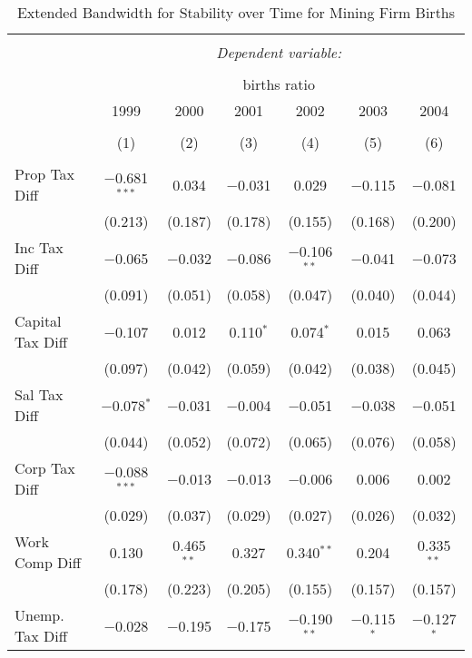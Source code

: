 
\begin{table}[!htbp] \centering 
  \caption{Extended Bandwidth for Stability over Time for  Mining Firm Births} 
  \label{21 ebyear} 
\small 
\begin{tabular}{@{\extracolsep{5pt}}lcccccc} 
\\[-1.8ex]\hline 
\hline \\[-1.8ex] 
 & \multicolumn{6}{c}{\textit{Dependent variable:}} \\ 
\cline{2-7} 
\\[-1.8ex] & \multicolumn{6}{c}{births ratio} \\ 
 & 1999 & 2000 & 2001 & 2002 & 2003 & 2004 \\ 
\\[-1.8ex] & (1) & (2) & (3) & (4) & (5) & (6)\\ 
\hline \\[-1.8ex] 
 Prop Tax Diff & $-$0.681$^{***}$ & 0.034 & $-$0.031 & 0.029 & $-$0.115 & $-$0.081 \\ 
  & (0.213) & (0.187) & (0.178) & (0.155) & (0.168) & (0.200) \\ 
  Inc Tax Diff & $-$0.065 & $-$0.032 & $-$0.086 & $-$0.106$^{**}$ & $-$0.041 & $-$0.073 \\ 
  & (0.091) & (0.051) & (0.058) & (0.047) & (0.040) & (0.044) \\ 
  Capital Tax Diff & $-$0.107 & 0.012 & 0.110$^{*}$ & 0.074$^{*}$ & 0.015 & 0.063 \\ 
  & (0.097) & (0.042) & (0.059) & (0.042) & (0.038) & (0.045) \\ 
  Sal Tax Diff & $-$0.078$^{*}$ & $-$0.031 & $-$0.004 & $-$0.051 & $-$0.038 & $-$0.051 \\ 
  & (0.044) & (0.052) & (0.072) & (0.065) & (0.076) & (0.058) \\ 
  Corp Tax Diff & $-$0.088$^{***}$ & $-$0.013 & $-$0.013 & $-$0.006 & 0.006 & 0.002 \\ 
  & (0.029) & (0.037) & (0.029) & (0.027) & (0.026) & (0.032) \\ 
  Work Comp Diff & 0.130 & 0.465$^{**}$ & 0.327 & 0.340$^{**}$ & 0.204 & 0.335$^{**}$ \\ 
  & (0.178) & (0.223) & (0.205) & (0.155) & (0.157) & (0.157) \\ 
  Unemp. Tax Diff & $-$0.028 & $-$0.195 & $-$0.175 & $-$0.190$^{**}$ & $-$0.115$^{*}$ & $-$0.127$^{*}$ \\ 

\end{tabular}
\end{table}
